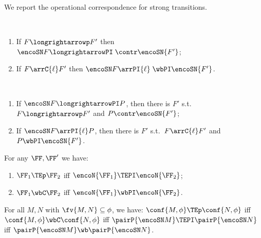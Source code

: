 \noindent
We report the operational correspondence for strong transitions.

\begin{lemma}
\label{l:CBNpogs_short}
$ $ \begin{enumerate}

\item  If $F \longrightarrowp F'$ then 
$ \encoSN F \longrightarrowPI \;  \contr \encoSN {F'}$; 

\item  If $F \arrC{\ell} F'$  then 
$ \encoSN F \arrPI{\ell}\;  \wbPI  \encoSN  {F'}$.
\end{enumerate}
\end{lemma}

 


\begin{lemma}
\label{l:CBNpogs_short_converse}
$ $ \begin{enumerate}

\item  If
$ \encoSN F \longrightarrowPI  P$, then there is $F'$ s.t.\  
 $F \longrightarrowp F'$ and 
$P 
\contr \encoSN {F'}$;

\item  If
$ \encoSN F \arrPI{\ell}  P$, then there is $F'$ s.t.\  
 $F \arrC{\ell} F'$ and 
$P 
\wbPI \encoSN {F'}$.
\end{enumerate}
\end{lemma} 



\begin{lemma} %
\label{l:ogsp_pi_traces_bisimulation_cbn}
For any $\FF,\FF'$ we have:
\begin{enumerate}
\item
 $\FF_1 \TEp \FF_2$ iff 
 $\encoN {\FF_1} \TEPI \encoN {\FF_2}$;  
\item
 $\FF_1 \wbC \FF_2$ iff 
 $\encoN {\FF_1} \wbPI  \encoN {\FF_2}$.  
\end{enumerate} 
\end{lemma} 


\begin{theorem}
\label{t:CBNfa_all}
For all $M,N$   with $\fv{M,N}\subseteq \phi$, we have: 
$\conf{ M,\phi} \TEp \conf{ N,\phi}$ iff 
$\conf{ M,\phi} \wbC \conf{ N,\phi}$ iff 
$\pairP{\encoSN M} \TEPI \pairP{\encoSN N}$
iff 
$\pairP{\encoSN M} \wb \pairP{\encoSN N}$. 
\end{theorem} 


